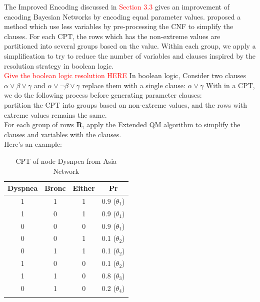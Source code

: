         The Improved Encoding discussed in \textcolor{red}{Section 3.3} gives an improvement of encoding Bayesian Networks by encoding equal parameter values. \cite{2006-enc3} proposed a method which use less variables by pre-processing the CNF to simplify the clauses.
        For each CPT, the rows which has the non-extreme values are partitioned into several groups based on the value. Within each group, we apply a simplification to try to reduce the number of variables and clauses inspired by the resolution strategy in boolean logic.\\
        \textcolor{red}{Give the boolean logic resolution HERE}
        In boolean logic, Consider two clauses $\alpha \vee \beta \vee \gamma$  and $\alpha \vee \neg\beta \vee \gamma$
        replace them with a single clause: $\alpha \vee \gamma$
        With in a CPT, we do the following process before generating parameter clauses:\\
        partition the CPT into groups based on non-extreme values, and the rows with extreme values remains the same.\\
        For each group of rows \textbf{R}, apply the Extended QM algorithm to simplify the clauses and variables with the clauses.\\
        Here's an example:\\
        \begin{table}[ht]
        \centering
        \begin{tabular}{c c c c}
            \hline
            \hline
            Dyspnea & Bronc & Either & Pr\\
            \hline
            \hline
            1 & 1 & 1 & 0.9 ($\theta_{1}$) \\
            1 & 0 & 1 & 0.9 ($\theta_{1}$)\\
            0 & 0 & 0 & 0.9 ($\theta_{1}$)\\
            0 & 0 & 1 & 0.1 ($\theta_{2}$)\\
            0 & 1 & 1 & 0.1 ($\theta_{2}$)\\
            1 & 0 & 0 & 0.1 ($\theta_{2}$)\\
            1 & 1 & 0 & 0.8 ($\theta_{3}$)\\
            0 & 1 & 0 & 0.2 ($\theta_{4}$)\\
            \hline
        \label{table:nyspnea_asia}
        \end{tabular}
        \caption{CPT of node Dysnpea from Asia Network}
        \end{table}
        

